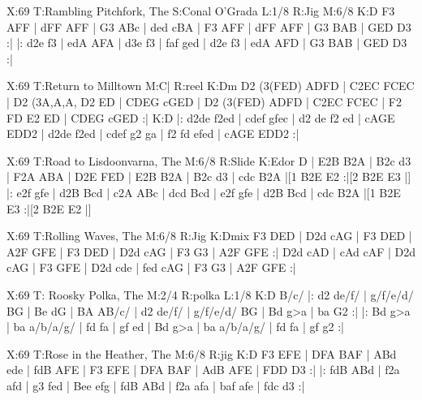 \documentclass{article}
\begin{document}
\begin{abc}[name]
X:69
T:Rambling Pitchfork, The
S:Conal O'Grada
L:1/8
R:Jig
M:6/8
K:D
F3 AFF | dFF AFF | G3 ABc | ded cBA |
F3 AFF | dFF AFF | G3 BAB | GED D3 :|
|: d2e f3 | edA AFA | d3e f3 | faf ged |
d2e f3 | edA AFD | G3 BAB | GED D3 :|
\end{abc}

\begin{abc}[name]
X:69
T:Return to Milltown
M:C|
R:reel
K:Dm
D2 (3(FED) ADFD | C2EC FCEC | D2 (3A,A,A, D2 ED | CDEG cGED |
D2 (3(FED) ADFD | C2EC FCEC | F2 FD E2 ED | CDEG cGED :|
K:D
|: d2de f2ed | cdef gfec | d2 de f2 ed | cAGE EDD2 |
d2de f2ed | cdef g2 ga | f2 fd efed | cAGE EDD2 :|
\end{abc}

\begin{abc}[name]
X:69
T:Road to Lisdoonvarna, The
M:6/8
R:Slide
K:Edor
D | E2B B2A | B2c d3 | F2A ABA | D2E FED |
E2B B2A | B2c d3 | cdc B2A |[1 B2E E2 :|[2 B2E E3 |]
|: e2f gfe | d2B Bcd | c2A ABc | dcd Bcd |
e2f gfe | d2B Bcd | cdc B2A |[1 B2E E3 :|[2 B2E E2 |]
\end{abc}

\begin{abc}[name]
X:69
T:Rolling Waves, The
M:6/8
R:Jig
K:Dmix
F3 DED | D2d cAG | F3 DED | A2F GFE |
F3 DED | D2d cAG | F3 G3 | A2F GFE :|
D2d cAD | cAd cAF | D2d cAG | F3 GFE |
D2d cde | fed cAG | F3 G3 | A2F GFE :|
\end{abc}

\begin{abc}[name]
X:69
T: Roosky Polka, The
M:2/4
R:polka
L:1/8
K:D
B/c/ |: d2 de/f/ | g/f/e/d/ BG | Be dG | BA AB/c/ | 
d2 de/f/ | g/f/e/d/ BG | Bd g>a | ba G2 :|
|: Bd g>a | ba a/b/a/g/ | fd fa | gf ed | 
Bd g>a | ba a/b/a/g/ | fd fa | gf g2 :| 
\end{abc}

\begin{abc}[name]
X:69
T:Rose in the Heather, The
M:6/8
R:jig
K:D
F3 EFE | DFA BAF | ABd ede | fdB AFE |
F3 EFE | DFA BAF | AdB AFE | FDD D3 :|
|: fdB ABd | f2a afd | g3 fed | Bee efg |
fdB ABd | f2a afa | baf afe | fdc d3 :|
\end{abc}
\end{document}
